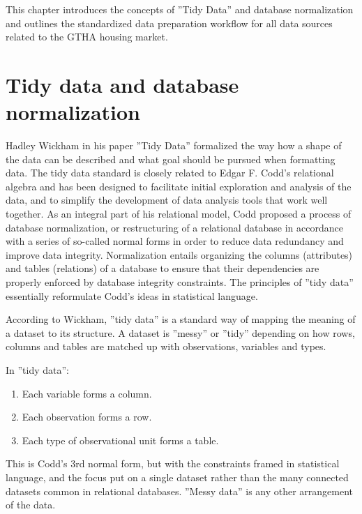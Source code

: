 This chapter introduces the concepts of ''Tidy Data'' and database normalization and outlines the standardized data preparation workflow for all data sources related to the GTHA housing market.

\section{Tidy data and database normalization} \label{sec:db_norm_tidy_data}

Hadley Wickham in his paper ''Tidy Data''\cite{Wickham2014} formalized the way how a shape of the data can be described and what goal should be pursued when formatting data.
The tidy data standard is closely related to Edgar F. Codd's relational algebra and has been designed to facilitate initial exploration and analysis of the data, and to simplify the development of data analysis tools that work well together.
As an integral part of his relational model, Codd\cite{Codd1990} proposed a process of database normalization, or restructuring of a relational database in accordance with a series of so-called normal forms in order to reduce data redundancy and improve data integrity.
Normalization entails organizing the columns (attributes) and tables (relations) of a database to ensure that their dependencies are properly enforced by database integrity constraints.
The principles of ''tidy data'' essentially reformulate Codd's ideas in statistical language.

According to Wickham\cite{Wickham2014}, ''tidy data'' is a standard way of mapping the meaning of a dataset to its structure.
A dataset is ''messy'' or ''tidy'' depending on how rows, columns and tables are matched up with observations, variables and types.

\vspace{5mm}

In ''tidy data'':
\begin{enumerate}
    \item Each variable forms a column.
    \item Each observation forms a row.
    \item Each type of observational unit forms a table.
\end{enumerate}

This is Codd's 3rd normal form\cite{Codd1990}, but with the constraints framed in statistical language, and the focus put on a single dataset rather than the many connected datasets common in relational databases.
''Messy data'' is any other arrangement of the data.

